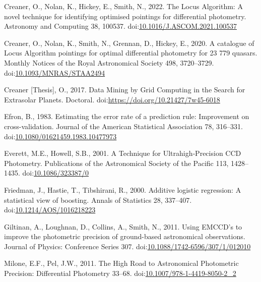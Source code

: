 \documentclass[]{elsarticle} %
\newlength{\cslhangindent}
\newlength{\cslentryspacingunit} %
\newenvironment{CSLReferences}[2] %
 {%
  \setlength{\parindent}{0pt}
  \ifodd #1
  \let\oldpar\par
  \def\par{\hangindent=\cslhangindent\oldpar}
  \fi
  \setlength{\parskip}{#2\cslentryspacingunit}
 }%
 {}
\begin{document}
\begin{CSLReferences}{1}{0}
\leavevmode{}%
Creaner, O., Nolan, K., Hickey, E., Smith, N., 2022. {The Locus
Algorithm: A novel technique for identifying optimised pointings for
differential photometry}. Astronomy and Computing 38, 100537.
doi:\href{https://doi.org/10.1016/J.ASCOM.2021.100537}{10.1016/J.ASCOM.2021.100537}

\leavevmode{}%
Creaner, O., Nolan, K., Smith, N., Grennan, D., Hickey, E., 2020. {A
catalogue of Locus Algorithm pointings for optimal differential
photometry for 23 779 quasars}. Monthly Notices of the Royal
Astronomical Society 498, 3720--3729.
doi:\href{https://doi.org/10.1093/MNRAS/STAA2494}{10.1093/MNRAS/STAA2494}

\leavevmode{}%
Creaner {[}Thesis{]}, O., 2017. {Data Mining by Grid Computing in the
Search for Extrasolar Planets}. Doctoral.
doi:\url{https://doi.org/10.21427/7w45-6018}

\leavevmode{}%
Efron, B., 1983. {Estimating the error rate of a prediction rule:
Improvement on cross-validation}. Journal of the American Statistical
Association 78, 316--331.
doi:\href{https://doi.org/10.1080/01621459.1983.10477973}{10.1080/01621459.1983.10477973}

\leavevmode{}%
Everett, M.E., Howell, S.B., 2001. {A Technique for Ultrahigh‐Precision
CCD Photometry}. Publications of the Astronomical Society of the Pacific
113, 1428--1435.
doi:\href{https://doi.org/10.1086/323387/0}{10.1086/323387/0}

\leavevmode{}%
Friedman, J., Hastie, T., Tibshirani, R., 2000. {Additive logistic
regression: A statistical view of boosting}. Annals of Statistics 28,
337--407.
doi:\href{https://doi.org/10.1214/AOS/1016218223}{10.1214/AOS/1016218223}

\leavevmode{}%
Giltinan, A., Loughnan, D., Collins, A., Smith, N., 2011. {Using EMCCD's
to improve the photometric precision of ground-based astronomical
observations}. Journal of Physics: Conference Series 307.
doi:\href{https://doi.org/10.1088/1742-6596/307/1/012010}{10.1088/1742-6596/307/1/012010}

\leavevmode{}%
Milone, E.F., Pel, J.W., 2011. {The High Road to Astronomical
Photometric Precision: Differential Photometry} 33--68.
doi:\href{https://doi.org/10.1007/978-1-4419-8050-2_2}{10.1007/978-1-4419-8050-2\_2}


\end{CSLReferences}
\end{document}

